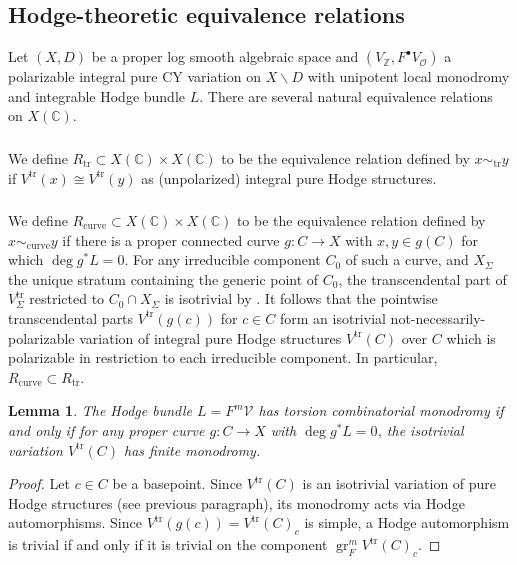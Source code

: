 \documentclass{amsart}
\newcommand{\bs}{\backslash}
\newtheorem{lem}[theorem]{Lemma}
\theoremstyle{definition}
\theoremstyle{remark}
\def\bZ{\mathbb{Z}}
\def\bC{\mathbb{C}}
\def\cO{\mathcal{O}}
\def\cV{\mathcal{V}}
\def\gr{\operatorname{gr}}
\def\trans{\mathrm{tr}}
\numberwithin{equation}{section}
\begin{document}

\subsection{Hodge-theoretic equivalence relations}\label{subsect:Hodge equiv reln}

Let $(X,D)$ be a proper log smooth algebraic space and $(V_\bZ,F^\bullet V_\cO)$ a polarizable integral pure CY variation on $X\bs D$ with unipotent local monodromy and integrable Hodge bundle $L$.  There are several natural equivalence relations on $X(\bC)$.  
\subsubsection{}\label{subsubsect:R_tr}We define $R_\trans\subset X(\bC)\times X(\bC)$ to be the equivalence relation defined by $x\sim_\trans y$ if $V^\trans(x)\cong V^\trans(y)$ as (unpolarized) integral pure Hodge structures.
\subsubsection{}\label{subsubsect:R_curve}We define $R_\mathrm{curve}\subset X(\bC)\times X(\bC)$ to be the equivalence relation defined by $x\sim_\mathrm{curve}y$ if there is a proper connected curve $g:C\to X$ with $x,y\in g(C)$ for which $\deg g^*L=0$. For any irreducible component $C_0$ of such a curve, and $X_\Sigma$ the unique stratum containing the generic point of $C_0$, the transcendental part of $V^\trans_\Sigma$ restricted to $C_0\cap X_\Sigma$ is isotrivial by .  It follows that the pointwise transcendental parts $V^\trans(g(c))$ for $c\in C$ form an isotrivial not-necessarily-polarizable variation of integral pure Hodge structures $V^\trans(C)$ over $C$ which is polarizable in restriction to each irreducible component.  In particular, $R_\mathrm{curve}\subset R_\trans$.
\begin{lem}\label{lem:torsion comb mono hodge vs tr}The Hodge bundle $L=F^m\cV$ has torsion combinatorial monodromy if and only if for any proper curve $g:C\to X$ with $\deg g^*L=0$, the isotrivial variation $V^\trans(C)$ has finite monodromy.
\end{lem}
\begin{proof}Let $c\in C$ be a basepoint. Since $V^\trans(C)$ is an isotrivial variation of pure Hodge structures (see previous paragraph), its monodromy acts via Hodge automorphisms.  Since $V^\trans(g(c))=V^\trans(C)_{c}$ is simple, a Hodge automorphism is trivial if and only if it is trivial on the component $\gr^m_FV^\trans(C)_{c}$. 
\end{proof}
\end{document}

